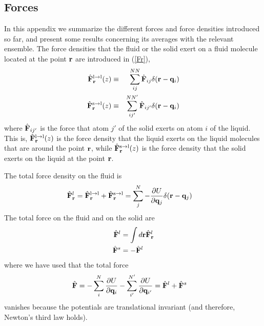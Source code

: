 \documentclass[b5paper,openright,11pt]{book}
\begin{document}
\begin{appendices}
\chapter{Forces}  
\label{Ap:Forces}
In this appendix we summarize the different forces and force densities
introduced so far, and present  some results  concerning its
averages  with the relevant  ensemble.  The  force densities  that the
fluid or the solid exert on a fluid molecule located at the point ${\bf
  r}$ are introduced in (\ref{Fr}),
\begin{eqnarray}
\hat{\bf F}^{\rm l\to l}_{\bf r}(z) &\equiv& \sum^{NN}_{ij}\hat{\bf F}_{ij}\delta({\bf r}-{\bf q}_i)
\nonumber\\
\hat{\bf F}^{\rm s\to l}_{\bf r}(z) &\equiv& \sum^{NN'}_{ij'}\hat{\bf F}_{ij'}\delta({\bf r}-{\bf q}_i)
\label{Fr_ap}
\end{eqnarray}
where $\hat{\bf  F}_{ij'}$ is the  force that  atom $j'$ of  the solid
exerts on  atom $i$ of  the liquid.   This is, $\hat{\bf  F}^{\rm l\to
  l}_{\bf r}(z) $  is the force density that the  liquid exerts on the
liquid molecules that are around  the point ${\bf r}$, while $\hat{\bf
  F}^{\rm  s\to l}_{\bf  r}(z)$ is  the force  density that  the solid
exerts on the liquid at the point ${\bf r}$.

The total force density on the fluid is
\begin{align}
\hat{\bf F}^l_{\bf r}&=\hat{\bf F}^{\rm l\to l}_{\bf r}+\hat{\bf F}^{\rm s\to l}_{\bf r} =\sum^{N}_{j}-\frac{\partial U}{\partial {\bf q}_{j}}\delta({\bf r}-{\bf q}_j)
\end{align}
The total force on the fluid and on the solid are
\begin{align}
  \hat{\bf F}^l&=\int d{\bf r}\hat{\bf F}^l_{\bf r}
\nonumber\\
  \hat{\bf F}^s&= -\hat{\bf F}^l
\end{align}
where we have used that the total force
\begin{align}
  \hat{\bf F}&=-\sum^N_{i}\frac{\partial U}{\partial {\bf q}_i}
-\sum^{N'}_{i'}\frac{\partial U}{\partial {\bf q}_{i'}}
=\hat{\bf F}^l+\hat{\bf F}^s
\end{align}
 vanishes because the  potentials are translational invariant (and
therefore, Newton's third law holds).


\end{appendices}
\end{document}
